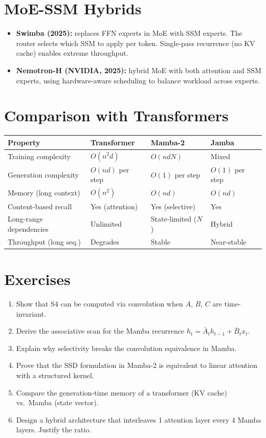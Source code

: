 \documentclass[11pt,a4paper]{book}
\theoremstyle{definition}
\begin{document}
\section{MoE-SSM Hybrids}

\begin{itemize}
	\item \textbf{Swimba (2025):} replaces FFN experts in MoE with SSM experts. The router selects which SSM to apply per token. Single-pass recurrence (no KV cache) enables extreme throughput.
	\item \textbf{Nemotron-H (NVIDIA, 2025):} hybrid MoE with both attention and SSM experts, using hardware-aware scheduling to balance workload across experts.
\end{itemize}

\section{Comparison with Transformers}

\begin{longtable}{p{3cm}p{3cm}p{3cm}p{3cm}}
	\toprule
	\textbf{Property}       & \textbf{Transformer} & \textbf{Mamba-2}    & \textbf{Jamba}  \\
	\midrule
	Training complexity     & $O(n^2 d)$           & $O(n d N)$          & Mixed           \\
	Generation complexity   & $O(n d)$ per step    & $O(1)$ per step     & $O(1)$ per step \\
	Memory (long context)   & $O(n^2)$             & $O(n d)$            & $O(n d)$        \\
	Content-based recall    & Yes (attention)      & Yes (selective)     & Yes             \\
	Long-range dependencies & Unlimited            & State-limited ($N$) & Hybrid          \\
	Throughput (long seq.)  & Degrades             & Stable              & Near-stable     \\
	\bottomrule
\end{longtable}

\section{Exercises}

\begin{enumerate}
	\item Show that S4 can be computed via convolution when $A$, $B$, $C$ are time-invariant.
	\item Derive the associative scan for the Mamba recurrence $h_t = \bar{A}_t h_{t-1} + \bar{B}_t x_t$.
	\item Explain why selectivity breaks the convolution equivalence in Mamba.
	\item Prove that the SSD formulation in Mamba-2 is equivalent to linear attention with a structured kernel.
	\item Compare the generation-time memory of a transformer (KV cache) vs.\ Mamba (state vector).
	\item Design a hybrid architecture that interleaves 1 attention layer every 4 Mamba layers. Justify the ratio.
\end{enumerate}
\end{document}
